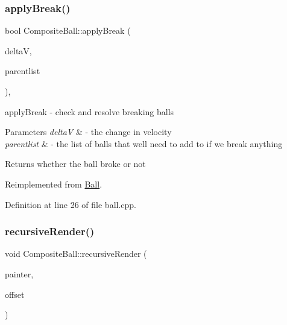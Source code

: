 \subsubsection{\texorpdfstring{apply\+Break()}{applyBreak()}}
{\footnotesize\ttfamily bool Composite\+Ball\+::apply\+Break (\begin{DoxyParamCaption}\item[{const Q\+Vector2D \&}]{deltaV,  }\item[{std\+::vector$<$ \mbox{\hyperlink{class_ball}{Ball}} $\ast$$>$ \&}]{parentlist }\end{DoxyParamCaption})\hspace{0.3cm}{\ttfamily [override]}, {\ttfamily [virtual]}}



apply\+Break -\/ check and resolve breaking balls 


\begin{DoxyParams}{Parameters}
{\em deltaV} & -\/ the change in velocity \\
\hline
{\em parentlist} & -\/ the list of balls that we\textquotesingle{}ll need to add to if we break anything \\
\hline
\end{DoxyParams}
\begin{DoxyReturn}{Returns}
whether the ball broke or not 
\end{DoxyReturn}


Reimplemented from \mbox{\hyperlink{class_ball_a9df4c9fc8620d003cf9717d84e64d5ee}{Ball}}.



Definition at line 26 of file ball.\+cpp.

\mbox{\label{class_composite_ball_a05f96cd1c4321d89763dce5a15b53138}} 
\subsubsection{\texorpdfstring{recursive\+Render()}{recursiveRender()}}
{\footnotesize\ttfamily void Composite\+Ball\+::recursive\+Render (\begin{DoxyParamCaption}\item[{Q\+Painter \&}]{painter,  }\item[{const Q\+Vector2D \&}]{offset }\end{DoxyParamCaption})\hspace{0.3cm}{\ttfamily [protected]}}




